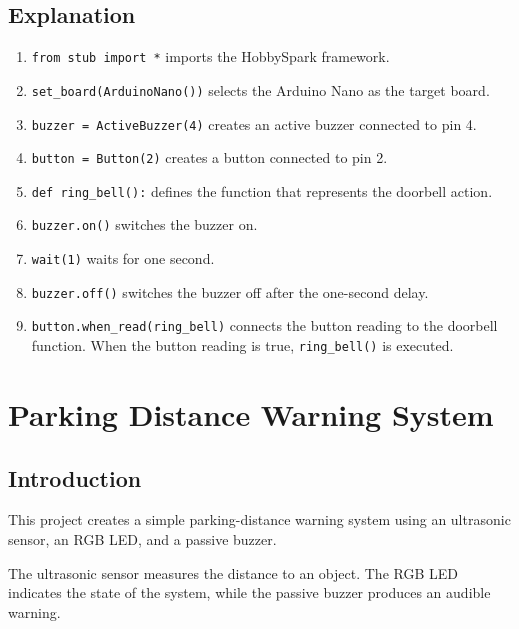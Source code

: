 \subsection{Explanation}

\begin{enumerate}
    \item \texttt{from stub import *} imports the HobbySpark framework.

    \item \texttt{set\_board(ArduinoNano())} selects the Arduino Nano as the
    target board.

    \item \texttt{buzzer = ActiveBuzzer(4)} creates an active buzzer connected
    to pin 4.

    \item \texttt{button = Button(2)} creates a button connected to pin 2.

    \item \texttt{def ring\_bell():} defines the function that represents the
    doorbell action.

    \item \texttt{buzzer.on()} switches the buzzer on.

    \item \texttt{wait(1)} waits for one second.

    \item \texttt{buzzer.off()} switches the buzzer off after the one-second
    delay.

    \item \texttt{button.when\_read(ring\_bell)} connects the button reading
    to the doorbell function. When the button reading is true,
    \texttt{ring\_bell()} is executed.
\end{enumerate}


\newpage

\section{Parking Distance Warning System}

\subsection{Introduction}

This project creates a simple parking-distance warning system using an
ultrasonic sensor, an RGB LED, and a passive buzzer.

The ultrasonic sensor measures the distance to an object. The RGB LED
indicates the state of the system, while the passive buzzer produces an
audible warning.

